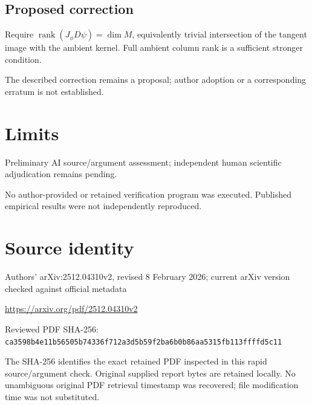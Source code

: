 \documentclass[11pt]{article}
\begin{document}
\subsection*{Proposed correction}

Require \(\operatorname{rank}(J_\phi D\psi)=\dim M\), equivalently trivial intersection of the tangent image with the ambient kernel. Full ambient column rank is a sufficient stronger condition.

The described correction remains a proposal; author adoption or a corresponding erratum is not established.

\section*{Limits}

Preliminary AI source/argument assessment; independent human scientific adjudication remains pending.\par

No author-provided or retained verification program was executed. Published empirical results were not independently reproduced.\par

\section*{Source identity}

Authors’ arXiv:2512.04310v2, revised 8 February 2026; current arXiv version checked against official metadata

\url{https://arxiv.org/pdf/2512.04310v2}

Reviewed PDF SHA-256: \nolinkurl{ca3598b4e11b56505b74336f712a3d5b59f2ba6b0b86aa5315fb113ffffd5c11}

The SHA-256 identifies the exact retained PDF inspected in this rapid source/argument check. Original supplied report bytes are retained locally. No unambiguous original PDF retrieval timestamp was recovered; file modification time was not substituted.
\end{document}
